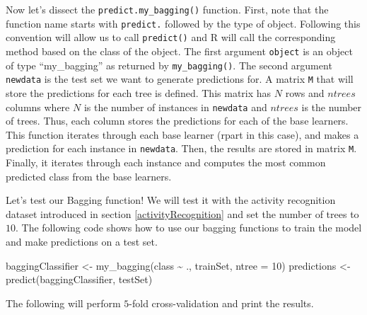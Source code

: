 \documentclass[
  11pt,
]{krantz}
\newenvironment{Shaded}{\begin{snugshade}}{\end{snugshade}}
\newcommand{\AttributeTok}[1]{\textcolor[rgb]{0.61,0.61,0.61}{#1}}
\newcommand{\DecValTok}[1]{\textcolor[rgb]{0.06,0.06,0.06}{#1}}
\newcommand{\FunctionTok}[1]{\textcolor[rgb]{0,0,0}{#1}}
\newcommand{\NormalTok}[1]{#1}
\newcommand{\OtherTok}[1]{\textcolor[rgb]{0.37,0.37,0.37}{#1}}
\newcommand{\SpecialCharTok}[1]{\textcolor[rgb]{0,0,0}{#1}}
\begin{document}
Now let's dissect the \texttt{predict.my\_bagging()} function. First, note that the function name starts with \texttt{predict.} followed by the type of object. Following this convention will allow us to call \texttt{predict()} and R will call the corresponding method based on the class of the object. The first argument \texttt{object} is an object of type ``my\_bagging'' as returned by \texttt{my\_bagging()}. The second argument \texttt{newdata} is the test set we want to generate predictions for. A matrix \texttt{M} that will store the predictions for each tree is defined. This matrix has \(N\) rows and \(ntrees\) columns where \(N\) is the number of instances in \texttt{newdata} and \(ntrees\) is the number of trees. Thus, each column stores the predictions for each of the base learners. This function iterates through each base learner (rpart in this case), and makes a prediction for each instance in \texttt{newdata}. Then, the results are stored in matrix \texttt{M}. Finally, it iterates through each instance and computes the most common predicted class from the base learners.

Let's test our Bagging function! We will test it with the activity recognition dataset introduced in section \ref{activityRecognition} and set the number of trees to \(10\). The following code shows how to use our bagging functions to train the model and make predictions on a test set.

\begin{Shaded}
\begin{Highlighting}[]
\NormalTok{baggingClassifier }\OtherTok{\textless{}{-}} \FunctionTok{my\_bagging}\NormalTok{(class }\SpecialCharTok{\textasciitilde{}}\NormalTok{ ., trainSet, }\AttributeTok{ntree =} \DecValTok{10}\NormalTok{)}
\NormalTok{predictions }\OtherTok{\textless{}{-}} \FunctionTok{predict}\NormalTok{(baggingClassifier, testSet)}
\end{Highlighting}
\end{Shaded}

The following will perform \(5\)-fold cross-validation and print the results.
\end{document}

